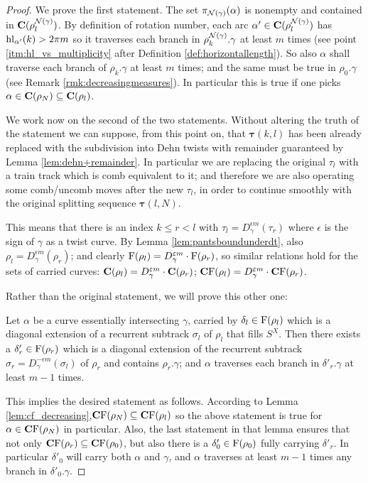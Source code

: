 \begin{proof}
We prove the first statement. The set $\pi_{{\mathcal N}(\gamma)}(\alpha)$ is nonempty and contained in $\mathbf C(\rho_l^{{\mathcal N}(\gamma)})$. By definition of rotation number, each arc $\alpha'\in \mathbf C(\rho_l^{{\mathcal N}(\gamma)})$ has $\mathrm{hl}_{\alpha'}(k)>2\pi m$ so it traverses each branch in $\rho_k^{{\mathcal N}(\gamma)}.\gamma$ at least $m$ times (see point \ref{itm:hl_vs_multiplicity} after Definition \ref{def:horizontallength}). So also $\alpha$ shall traverse each branch of $\rho_k.\gamma$ at least $m$ times; and the same must be true in $\rho_0.\gamma$ (see Remark \ref{rmk:decreasingmeasures}). In particular this is true if one picks $\alpha\in \mathbf C(\rho_N)\subseteq \mathbf C(\rho_l)$.

We work now on the second of the two statements. Without altering the truth of the statement we can suppose, from this point on, that $\bm\tau(k,l)$ has been already replaced with the subdivision into Dehn twists with remainder guaranteed by Lemma \ref{lem:dehn+remainder}. In particular we are replacing the original $\tau_l$ with a train track which is comb equivalent to it; and therefore we are also operating some comb/uncomb moves after the new $\tau_l$, in order to continue smoothly with the original splitting sequence $\bm\tau(l,N)$.

This means that there is an index $k\leq r< l$ with $\tau_l=D_\gamma^{\epsilon m}(\tau_r)$ where $\epsilon$ is the sign of $\gamma$ as a twist curve. By Lemma \ref{lem:pantsboundunderdt}, also $\rho_l=D_{\gamma}^{\epsilon m}(\rho_r)$; and clearly $\mathrm{F}(\rho_l)=D_{\gamma}^{\varepsilon m}\cdot \mathrm{F}(\rho_r)$, so similar relations hold for the sets of carried curves: $\mathbf C(\rho_l)=D_{\gamma}^{\varepsilon m}\cdot\mathbf C(\rho_r)$; $\mathbf C \mathrm F(\rho_l)=D_{\gamma}^{\varepsilon m}\cdot \mathbf C \mathrm F(\rho_r)$.

Rather than the original statement, we will prove this other one:
\begin{claim}
Let $\alpha$ be a curve essentially intersecting $\gamma$, carried by $\delta_l\in \mathrm{F}(\rho_l)$ which is a diagonal extension of a recurrent subtrack $\sigma_l$ of $\rho_l$ that fills $S^X$. Then there exists a $\delta'_r\in \mathrm{F}(\rho_r)$ which is a diagonal extension of the recurrent subtrack $\sigma_r=D_{\gamma}^{-\epsilon m}(\sigma_l)$ of $\rho_r$ and contains $\rho_r.\gamma$; and $\alpha$ traverses each branch in $\delta'_r.\gamma$ at least $m-1$ times.
\end{claim}

This implies the desired statement as follows. According to Lemma \ref{lem:cf_decreasing},\linebreak $\mathbf C \mathrm F(\rho_N)\subseteq \mathbf C \mathrm F(\rho_l)$ so the above statement is true for $\alpha\in\mathbf C \mathrm F(\rho_N)$ in particular. Also, the last statement in that lemma ensures that not only $\mathbf C \mathrm F(\rho_r)\subseteq \mathbf C \mathrm F(\rho_0)$, but also there is a $\delta'_0\in \mathrm{F}(\rho_0)$ fully carrying $\delta'_r$. In particular $\delta'_0$ will carry both $\alpha$ and $\gamma$, and $\alpha$ traverses at least $m-1$ times any branch in $\delta'_0.\gamma$.


\end{proof}
